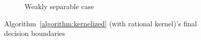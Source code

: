 \begin{figure}[h!]
\begin{subfigure}[b]{0.25\textwidth}
         \caption{Weakly separable case}
    \end{subfigure}
    \captionsetup{justification=centering}
    \caption{Algorithm~\ref{algorithm:kernelized} (with rational kernel)'s final decision boundaries}
    \label{fig:rationalova-points}
\end{figure}
